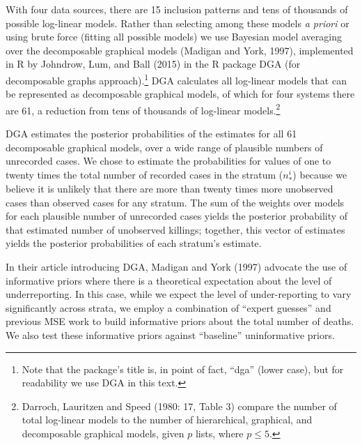 \documentclass[11pt,]{article}
\let\rmarkdownfootnote\footnote%
\def\footnote{\protect\rmarkdownfootnote}
\begin{document}
With four data sources, there are 15 inclusion patterns and tens of
thousands of possible log-linear models. Rather than selecting among
these models \emph{a priori} or using brute force (fitting all possible
models) we use Bayesian model averaging over the decomposable graphical
models (Madigan and York, 1997), implemented in \textsf{R} by Johndrow,
Lum, and Ball (2015) in the \textsf{R} package DGA (for decomposable
graphs approach).\footnote{Note that the package's title is, in point of
  fact, ``dga'' (lower case), but for readability we use DGA in this
  text.} DGA calculates all log-linear models that can be represented as
decomposable graphical models, of which for four systems there are 61, a
reduction from tens of thousands of log-linear models.\footnote{Darroch,
  Lauritzen and Speed (1980: 17, Table 3) compare the number of total
  log-linear models to the number of hierarchical, graphical, and
  decomposable graphical models, given \(p\) lists, where \(p \leq 5\).}

DGA estimates the posterior probabilities of the estimates for all 61
decomposable graphical models, over a wide range of plausible numbers of
unrecorded cases. We chose to estimate the probabilities for values of
one to twenty times the total number of recorded cases in the stratum
(\(n^{i}_{*}\)) because we believe it is unlikely that there are more
than twenty times more unobserved cases than observed cases for any
stratum. The sum of the weights over models for each plausible number of
unrecorded cases yields the posterior probability of that estimated
number of unobserved killings; together, this vector of estimates yields
the posterior probabilities of each stratum's estimate.

In their article introducing DGA, Madigan and York (1997) advocate the
use of informative priors where there is a theoretical expectation about
the level of underreporting. In this case, while we expect the level of
under-reporting to vary significantly across strata, we employ a
combination of ``expert guesses'' and previous MSE work to build
informative priors about the total number of deaths. We also test these
informative priors against ``baseline'' uninformative priors.
\end{document}
